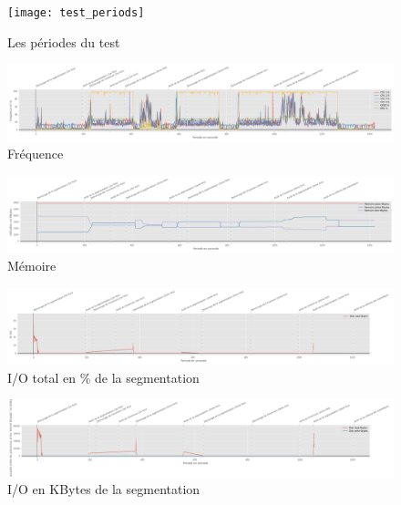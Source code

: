 \begin{figure}[H]
   \centering
   \texttt{[image: test\_periods]}
   \caption{Les périodes du test}
   \label{fig:test_periods}
\end{figure}
{
   \clearpage 
   \newpage
   \begin{landscape}
   \begin{figure}[H]
      \centering
      \includegraphics[width=1.5\textwidth]{frequency_usage}
      \caption{Fréquence}
      \label{fig:frequency_usage}
   \end{figure}
   \begin{figure}[H]
      \centering
      \includegraphics[width=1.5\textwidth]{memory_usage}
      \caption{Mémoire}
      \label{fig:memory_usage}
   \end{figure} 
   \begin{figure}[H]
      \centering
      \includegraphics[width=1.5\textwidth]{io}
      \caption{I/O total en \% de la segmentation}
      \label{fig:io}
   \end{figure}
   \begin{figure}[H]
      \centering
      \includegraphics[width=1.5\textwidth]{io_segnetcamera}
      \caption{I/O en KBytes de la segmentation}
      \label{fig:io_segnetcamera}
   \end{figure} 
   \begin{figure}[H]

\end{figure}
\end{landscape}}

